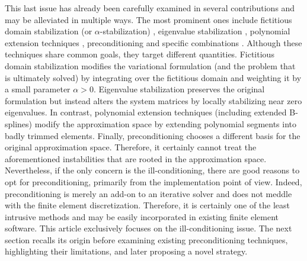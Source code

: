 \documentclass{article}
\numberwithin{equation}{section}
\theoremstyle{definition}
\begin{document}
This last issue has already been carefully examined in several contributions and may be alleviated in multiple ways. The most prominent ones include fictitious domain stabilization (or $\alpha$-stabilization) \cite{parvizian2007finite,schillinger2015finite}, eigenvalue stabilization \cite{garhuom2022eigenvalue,eisentrager2024eigenvalue}, polynomial extension techniques \cite{buffa2020minimal,hollig2005introduction,marussig2017stable}, preconditioning \cite{de2017condition,de2019preconditioning,de2023stability} and specific combinations \cite{eisentrager2024eigenvalue}. Although these techniques share common goals, they target different quantities. Fictitious domain stabilization modifies the variational formulation (and the problem that is ultimately solved) by integrating over the fictitious domain and weighting it by a small parameter $\alpha > 0$. Eigenvalue stabilization preserves the original formulation but instead alters the system matrices by locally stabilizing near zero eigenvalues. In contrast, polynomial extension techniques (including extended B-splines) modify the approximation space by extending polynomial segments into badly trimmed elements. Finally, preconditioning chooses a different basis for the original approximation space. Therefore, it certainly cannot treat the aforementioned instabilities that are rooted in the approximation space. Nevertheless, if the only concern is the ill-conditioning, there are good reasons to opt for preconditioning, primarily from the implementation point of view. Indeed, preconditioning is merely an add-on to an iterative solver and does not meddle with the finite element discretization. Therefore, it is certainly one of the least intrusive methods and may be easily incorporated in existing finite element software. This article exclusively focuses on the ill-conditioning issue. The next section recalls its origin before examining existing preconditioning techniques, highlighting their limitations, and later proposing a novel strategy.
\end{document}
